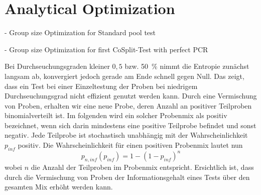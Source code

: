 \documentclass[fleqn,10pt]{wlscirep}
\begin{document}





\section{Analytical Optimization}
\label{sec:analytics}
- Group size Optimization for Standard pool test

- Group size Optimization for first CoSplit-Test with perfect PCR

Bei Durchseuchungsgraden kleiner $0,5$ bzw. \SI{50}{\percent} nimmt die Entropie zunächst langsam ab, konvergiert jedoch gerade am Ende schnell gegen Null. Das zeigt, dass ein Test bei einer Einzeltestung der Proben bei niedrigem Durchseuchungsgrad nicht effizient genutzt werden kann.
Durch eine Vermischung von Proben, erhalten wir eine neue Probe, deren Anzahl an positiver Teilproben binomialverteilt ist. Im folgenden wird ein solcher Probenmix als positiv bezeichnet, wenn sich darin mindestens eine positive Teilprobe befindet und sonst negativ. Jede Teilprobe ist stochastisch unabhängig mit der Wahrscheinlichkeit $p_{inf}$ positiv. Die Wahrscheinlichkeit für einen positiven Probenmix lautet nun
\begin{equation}
p_{n,inf}(p_{inf}) = 1-(1-p_{inf})^n 
\end{equation}
wobei $n$ die Anzahl der Teilproben im Probenmix entspricht. Ersichtlich ist, dass durch die Vermischung von Proben der Informationsgehalt eines Tests über den gesamten Mix erhöht werden kann. 
\end{document}
